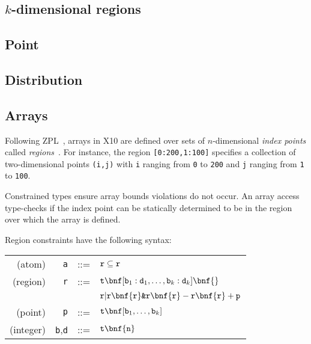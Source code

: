 \subsection{$k$-dimensional regions}

% 

\subsection{Point}


% 

\subsection{Distribution}


% 

\subsection{Arrays}

Following ZPL~\cite{ZPL}, arrays in X10
are defined over sets of $n$-dimensional {\em index points}
called {\em regions}~\cite{gps06-arrays}.
For instance, the region {\tt [0:200,1:100]} specifies a
collection of two-dimensional points {\tt (i,j)} with {\tt i}
ranging from {\tt 0} to {\tt 200} and {\tt j} ranging from
{\tt 1} to {\tt 100}.

Constrained types ensure array bounds
violations do not occur.
An array access type-checks if the index point can be statically
determined to be in the region over which the array is defined.

Region constraints have the following syntax:

\begin{tabular}{rrcl}
  (atom)   &{\tt a} &::=& ${\tt r} \subseteq {\tt r}$ \\
  (region) &{\tt r} &::=& ${\tt t} \bnf [{\tt b}_1:{\tt
  d}_1,\ldots,{\tt b}_k:{\tt d}_k] \bnf {}$  \\
           &        && ${\tt r} | {\tt r} \bnf {\tt r} \mbox{\tt \&} {\tt r} \bnf {\tt r} - {\tt r} \bnf {\tt r} + {\tt p}$ \\
  (point)  &{\tt p} &::=& ${\tt t} \bnf [{\tt b}_1,\ldots,{\tt b}_k]$ \\
(integer)&{\tt b},{\tt d} &::=& ${\tt t} \bnf {\tt n}$ \\
\end{tabular}

